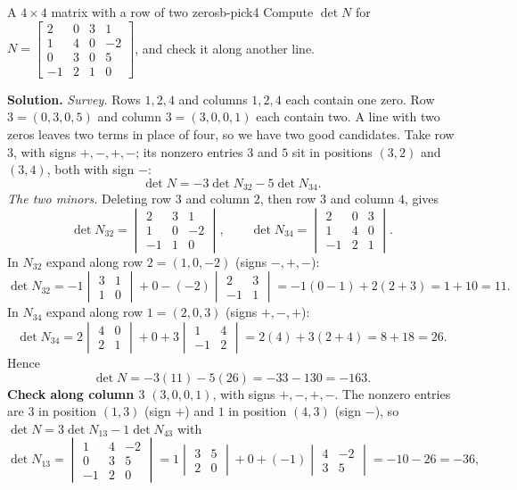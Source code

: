 \documentclass[11pt]{article}
\begin{document}
\begin{exmp}{A $4\times4$ matrix with a row of two zeros}{b-pick4}
Compute $\det N$ for $N=\begin{bmatrix}2&0&3&1\\1&4&0&-2\\0&3&0&5\\-1&2&1&0\end{bmatrix}$, and check it along another line.

\textbf{Solution.} \emph{Survey.} Rows $1,2,4$ and columns $1,2,4$ each contain one zero. Row $3=(0,3,0,5)$ and column $3=(3,0,0,1)$ each contain two. A line with two zeros leaves two terms in place of four, so we have two good candidates. Take row $3$, with signs $+,-,+,-$; its nonzero entries $3$ and $5$ sit in positions $(3,2)$ and $(3,4)$, both with sign $-$:
\[
\det N=-3\det N_{32}-5\det N_{34}.
\]
\emph{The two minors.} Deleting row $3$ and column $2$, then row $3$ and column $4$, gives
\[
\det N_{32}=\begin{vmatrix}2&3&1\\1&0&-2\\-1&1&0\end{vmatrix},\qquad \det N_{34}=\begin{vmatrix}2&0&3\\1&4&0\\-1&2&1\end{vmatrix}.
\]
In $N_{32}$ expand along row $2=(1,0,-2)$ (signs $-,+,-$):
\[
\det N_{32}=-1\begin{vmatrix}3&1\\1&0\end{vmatrix}+0-(-2)\begin{vmatrix}2&3\\-1&1\end{vmatrix}=-1(0-1)+2(2+3)=1+10=11.
\]
In $N_{34}$ expand along row $1=(2,0,3)$ (signs $+,-,+$):
\[
\det N_{34}=2\begin{vmatrix}4&0\\2&1\end{vmatrix}+0+3\begin{vmatrix}1&4\\-1&2\end{vmatrix}=2(4)+3(2+4)=8+18=26.
\]
Hence
\[
\det N=-3(11)-5(26)=-33-130=-163.
\]
\textbf{Check along column $3$} $(3,0,0,1)$, with signs $+,-,+,-$. The nonzero entries are $3$ in position $(1,3)$ (sign $+$) and $1$ in position $(4,3)$ (sign $-$), so $\det N=3\det N_{13}-1\det N_{43}$ with
\[
\det N_{13}=\begin{vmatrix}1&4&-2\\0&3&5\\-1&2&0\end{vmatrix}=1\begin{vmatrix}3&5\\2&0\end{vmatrix}+0+(-1)\begin{vmatrix}4&-2\\3&5\end{vmatrix}=-10-26=-36,
\]
\end{exmp}
\end{document}
